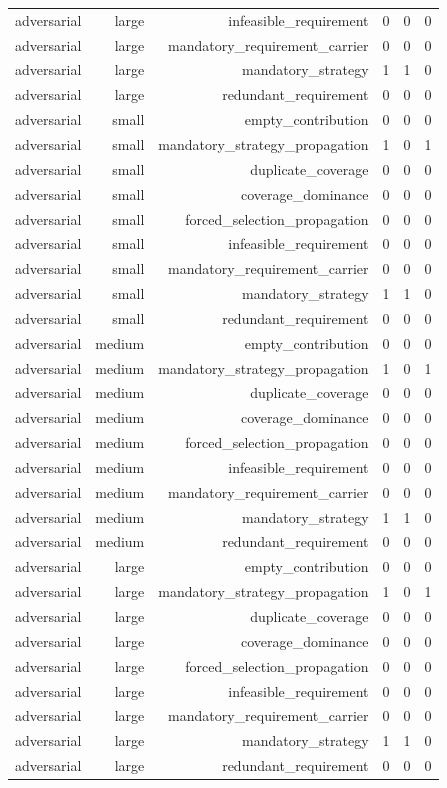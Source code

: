 {\begin{longtable}{lrrrrr}
adversarial & large & infeasible\_requirement & 0 & 0 & 0 \\
adversarial & large & mandatory\_requirement\_carrier & 0 & 0 & 0 \\
adversarial & large & mandatory\_strategy & 1 & 1 & 0 \\
adversarial & large & redundant\_requirement & 0 & 0 & 0 \\
adversarial & small & empty\_contribution & 0 & 0 & 0 \\
adversarial & small & mandatory\_strategy\_propagation & 1 & 0 & 1 \\
adversarial & small & duplicate\_coverage & 0 & 0 & 0 \\
adversarial & small & coverage\_dominance & 0 & 0 & 0 \\
adversarial & small & forced\_selection\_propagation & 0 & 0 & 0 \\
adversarial & small & infeasible\_requirement & 0 & 0 & 0 \\
adversarial & small & mandatory\_requirement\_carrier & 0 & 0 & 0 \\
adversarial & small & mandatory\_strategy & 1 & 1 & 0 \\
adversarial & small & redundant\_requirement & 0 & 0 & 0 \\
adversarial & medium & empty\_contribution & 0 & 0 & 0 \\
adversarial & medium & mandatory\_strategy\_propagation & 1 & 0 & 1 \\
adversarial & medium & duplicate\_coverage & 0 & 0 & 0 \\
adversarial & medium & coverage\_dominance & 0 & 0 & 0 \\
adversarial & medium & forced\_selection\_propagation & 0 & 0 & 0 \\
adversarial & medium & infeasible\_requirement & 0 & 0 & 0 \\
adversarial & medium & mandatory\_requirement\_carrier & 0 & 0 & 0 \\
adversarial & medium & mandatory\_strategy & 1 & 1 & 0 \\
adversarial & medium & redundant\_requirement & 0 & 0 & 0 \\
adversarial & large & empty\_contribution & 0 & 0 & 0 \\
adversarial & large & mandatory\_strategy\_propagation & 1 & 0 & 1 \\
adversarial & large & duplicate\_coverage & 0 & 0 & 0 \\
adversarial & large & coverage\_dominance & 0 & 0 & 0 \\
adversarial & large & forced\_selection\_propagation & 0 & 0 & 0 \\
adversarial & large & infeasible\_requirement & 0 & 0 & 0 \\
adversarial & large & mandatory\_requirement\_carrier & 0 & 0 & 0 \\
adversarial & large & mandatory\_strategy & 1 & 1 & 0 \\
adversarial & large & redundant\_requirement & 0 & 0 & 0 \\
\bottomrule
\end{longtable}
}
